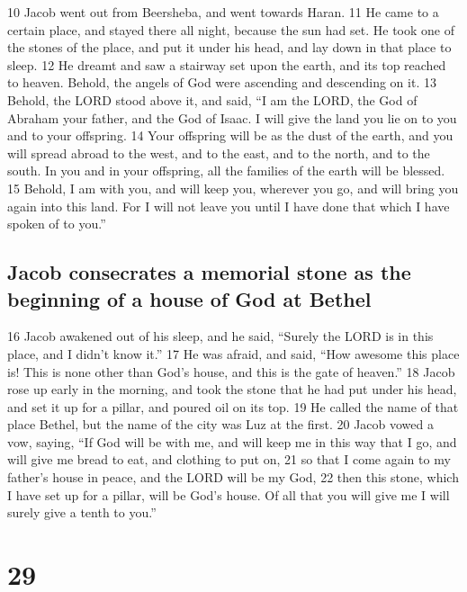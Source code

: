 {10} Jacob went out from Beersheba, and went towards Haran. {11} He came
to a certain place, and stayed there all night, because the sun had set.
He took one of the stones of the place, and put it under his head, and
lay down in that place to sleep. {12} He dreamt and saw a stairway set
upon the earth, and its top reached to heaven. Behold, the angels of God
were ascending and descending on it. {13} Behold, the LORD stood above
it, and said, ``I am the LORD, the God of Abraham your father, and the
God of Isaac. I will give the land you lie on to you and to your
offspring. {14} Your offspring will be as the dust of the earth, and you
will spread abroad to the west, and to the east, and to the north, and
to the south. In you and in your offspring, all the families of the
earth will be blessed. {15} Behold, I am with you, and will keep you,
wherever you go, and will bring you again into this land. For I will not
leave you until I have done that which I have spoken of to you.''

\hypertarget{jacob-consecrates-a-memorial-stone-as-the-beginning-of-a-house-of-god-at-bethel}{%
\subsection{Jacob consecrates a memorial stone as the beginning of a
house of God at
Bethel}\label{jacob-consecrates-a-memorial-stone-as-the-beginning-of-a-house-of-god-at-bethel}}

{16} Jacob awakened out of his sleep, and he said, ``Surely the LORD is
in this place, and I didn't know it.'' {17} He was afraid, and said,
``How awesome this place is! This is none other than God's house, and
this is the gate of heaven.'' {18} Jacob rose up early in the morning,
and took the stone that he had put under his head, and set it up for a
pillar, and poured oil on its top. {19} He called the name of that place
Bethel, but the name of the city was Luz at the first. {20} Jacob vowed
a vow, saying, ``If God will be with me, and will keep me in this way
that I go, and will give me bread to eat, and clothing to put on, {21}
so that I come again to my father's house in peace, and the LORD will be
my God, {22} then this stone, which I have set up for a pillar, will be
God's house. Of all that you will give me I will surely give a tenth to
you.''

\hypertarget{section-28}{%
\section{29}\label{section-28}}

